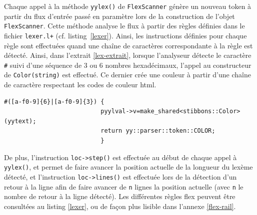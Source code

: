 Chaque appel à la méthode \verb|yylex()| de \verb|FlexScanner| génère un nouveau token à partir du flux d'entrée passé en paramètre lors de la construction de l'objet \verb|FlexScanner|. Cette méthode analyse le flux à partir des règles définies dans le fichier \verb|lexer.l+| (cf. listing~\ref{lexer}). Ainsi, les instructions définies pour chaque règle sont effectuées quand une chaîne de caractères correspondante à la règle est détecté. Ainsi, dans l'extrait \ref{lex-extrait}, lorsque l'analyseur détecte le caractère \verb|#| suivi d'une séquence de 3 ou 6 nombres hexadécimaux, l'appel au constructeur de \verb|Color(string)| est effectué. Ce dernier crée une couleur à partir d'une chaîne de caractère respectant les codes de couleur html.

\begin{lstlisting}[label=lex-extrait,caption=Exemple de séquence d'instruction lors de la détection d'une couleur]
#([a-f0-9]{6}|[a-f0-9]{3}) {
                           pyylval->v=make_shared<stibbons::Color>(yytext); 
                           return yy::parser::token::COLOR;
                           }
\end{lstlisting}

De plus, l'instruction \verb|loc->step()| est effectuée au début de chaque appel à \verb|yylex()|, et permet de faire avancer la position actuelle de la longueur du lexème détecté, et l'instruction \verb|loc->lines()| est effectuée lors de la détection d'un retour à la ligne afin de faire avancer de \verb|n| lignes la position actuelle (avec \verb|n| le nombre de retour à la ligne détecté).
Les différentes règles flex peuvent être consultées au listing \ref{lexer}, ou de façon plus lisible dans l'annexe \ref{flex-rail}.
